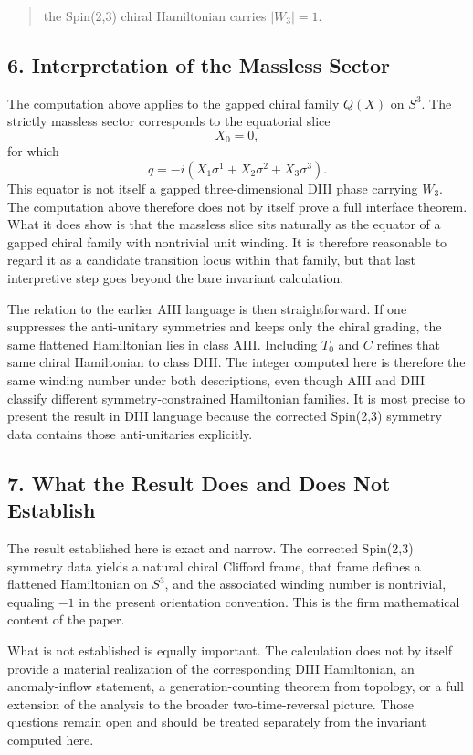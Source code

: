 \documentclass[
]{article}
\begin{document}
\begin{quote}
the Spin(2,3) chiral Hamiltonian carries \(|W_3| = 1\).
\end{quote}

\subsection{6. Interpretation of the Massless
Sector}\label{interpretation-of-the-massless-sector}

The computation above applies to the gapped chiral family \(Q(X)\) on
\(S^3\). The strictly massless sector corresponds to the equatorial
slice \[
X_0 = 0,
\] for which \[
q = - i(X_1 \sigma^1 + X_2 \sigma^2 + X_3 \sigma^3).
\] This equator is not itself a gapped three-dimensional DIII phase
carrying \(W_3\). The computation above therefore does not by itself
prove a full interface theorem. What it does show is that the massless
slice sits naturally as the equator of a gapped chiral family with
nontrivial unit winding. It is therefore reasonable to regard it as a
candidate transition locus within that family, but that last
interpretive step goes beyond the bare invariant calculation.

The relation to the earlier AIII language is then straightforward. If
one suppresses the anti-unitary symmetries and keeps only the chiral
grading, the same flattened Hamiltonian lies in class AIII. Including
\(T_0\) and \(C\) refines that same chiral Hamiltonian to class DIII.
The integer computed here is therefore the same winding number under
both descriptions, even though AIII and DIII classify different
symmetry-constrained Hamiltonian families. It is most precise to present
the result in DIII language because the corrected Spin(2,3) symmetry
data contains those anti-unitaries explicitly.

\subsection{7. What the Result Does and Does Not
Establish}\label{what-the-result-does-and-does-not-establish}

The result established here is exact and narrow. The corrected Spin(2,3)
symmetry data yields a natural chiral Clifford frame, that frame defines
a flattened Hamiltonian on \(S^3\), and the associated winding number is
nontrivial, equaling \(-1\) in the present orientation convention. This
is the firm mathematical content of the paper.

What is not established is equally important. The calculation does not
by itself provide a material realization of the corresponding DIII
Hamiltonian, an anomaly-inflow statement, a generation-counting theorem
from topology, or a full extension of the analysis to the broader
two-time-reversal picture. Those questions remain open and should be
treated separately from the invariant computed here.
\end{document}
